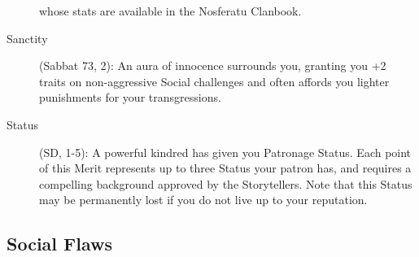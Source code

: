 \begin{description}
	whose stats are available in the Nosferatu Clanbook.
	\item[Sanctity] (Sabbat 73, 2):  An aura of innocence surrounds you, granting you +2 traits 
	on non-aggressive Social challenges and often affords you lighter punishments for your 
	transgressions.
	\item[Status] (SD, 1-5):  A powerful kindred has given you Patronage Status.  Each point of 
	this Merit represents up to three Status your patron has, and requires a compelling background 
	approved by the Storytellers.  Note that this Status may be permanently lost if you do not live 
	up to your reputation.
\end{description}

\subsection{Social Flaws}

